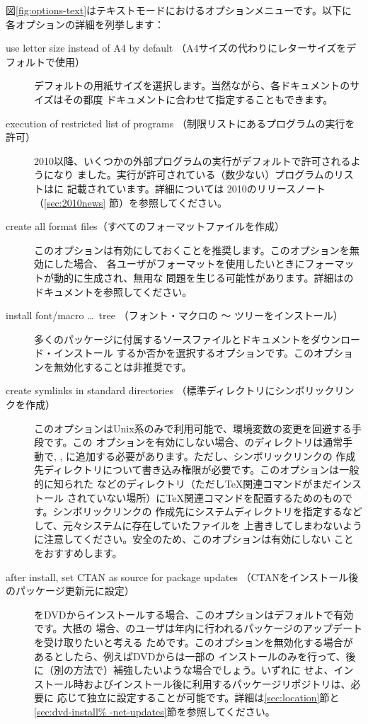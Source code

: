\documentclass[uplatex,dvipdfmx,12pt,tombow]{jsarticle}
\begin{document}
図\ref{fig:options-text}はテキストモードにおけるオプションメニューです。以下に
各オプションの詳細を列挙します：
%
\begin{description}
\item[use letter size instead of A4 by default%
（A4サイズの代わりにレターサイズをデフォルトで使用）]
デフォルトの用紙サイズを選択します。当然ながら、各ドキュメントのサイズはその都度
ドキュメントに合わせて指定することもできます。

\item[execution of restricted list of programs%
（制限リストにあるプログラムの実行を許可）]
\TL{} 2010以降、いくつかの外部プログラムの実行がデフォルトで許可されるようになり
ました。実行が許可されている（数少ない）プログラムのリストはに
記載されています。詳細については\TL{} 2010のリリースノート（\ref{sec:2010news}%
節）を参照してください。

\item[create all format files（すべてのフォーマットファイルを作成）]
このオプションは有効にしておくことを推奨します。このオプションを無効にした場合、
各ユーザがフォーマットを使用したいときにフォーマットが動的に生成され、無用な
問題を生じる可能性があります。詳細はのドキュメントを参照してください。

\item[install font/macro \dots\ tree%
（フォント・マクロの 〜 ツリーをインストール）]
多くのパッケージに付属するソースファイルとドキュメントをダウンロード・インストール
するか否かを選択するオプションです。このオプションを無効化することは非推奨です。

\item[create symlinks in standard directories%
（標準ディレクトリにシンボリックリンクを作成）]
このオプションはUnix系のみで利用可能で、環境変数の変更を回避する手段です。この
オプションを有効にしない場合、\TL のディレクトリは通常手動で, , に追加する必要があります。ただし、シンボリックリンクの
作成先ディレクトリについて書き込み権限が必要です。このオプションは一般的に知られた
などのディレクトリ（ただし\TeX 関連コマンドがまだインストール
されていない場所）に\TeX 関連コマンドを配置するためのものです。シンボリックリンクの
作成先にシステムディレクトリを指定するなどして、元々システムに存在していたファイルを
上書きしてしまわないように注意してください。安全のため、このオプションは有効にしない
ことをおすすめします。

\item[after install, set CTAN as source for package updates%
（CTANをインストール後のパッケージ更新元に設定）]
\TL をDVDからインストールする場合、このオプションはデフォルトで有効です。大抵の
場合、\TL のユーザは年内に行われるパッケージのアップデートを受け取りたいと考える
ためです。このオプションを無効化する場合があるとしたら、例えばDVDからは一部の
インストールのみを行って、後に（別の方法で）補強したいような場合でしょう。いずれに
せよ、インストール時およびインストール後に利用するパッケージリポジトリは、必要に
応じて独立に設定することが可能です。詳細は\ref{sec:location}節と\ref{sec:dvd-install%
-net-updates}節を参照してください。
\end{description}
\end{document}
